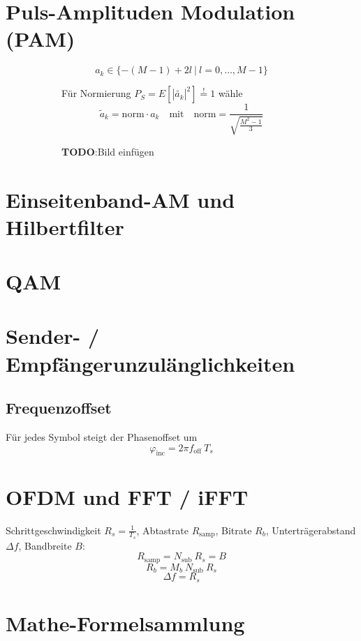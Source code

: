 \documentclass[a4paper, 11pt]{article}
\begin{document}
\section*{Puls-Amplituden Modulation (PAM)}
\begin{figure}[H]
	\begin{subfigure}{0.54\textwidth}
		\[
			a_{k} \in \{-(M - 1) + 2l ~ | ~ l = 0, \ldots, M-1\}
		\]

		Für Normierung $P_S = E \left[|\tilde{a_k}|^2 \right] \overset{!}{=} 1$ wähle
		\[
			\tilde a_k = \mathrm{norm} \cdot a_k \quad \text{mit} \quad \mathrm{norm} = \frac{1}{\sqrt{\frac{M^2 - 1}{3}}}
		\]
	\end{subfigure}
	\begin{subfigure}{0.45\textwidth}
		\textbf{TODO}:Bild einfügen 
	\end{subfigure}
\end{figure}


\section*{Einseitenband-AM und Hilbertfilter}
\section*{QAM}
\section*{Sender- / Empfängerunzulänglichkeiten}
\subsection*{Frequenzoffset}
Für jedes Symbol steigt der Phasenoffset um
\[
	\varphi_{\mathrm{inc}} = 2 \pi f_{\mathrm{off}} ~ T_s
\]

\section*{OFDM und FFT / iFFT}
Schrittgeschwindigkeit $R_s = \frac{1}{T_s}$, Abtastrate $R_{\mathrm{samp}}$, Bitrate $R_b$, Unterträgerabstand $\Delta f$, Bandbreite $B$:
\[
	R_{\mathrm{samp}} = N_{\mathrm{sub}} ~ R_s = B
\]
\[
	R_b = M_b ~ N_{\mathrm{sub}} ~ R_s
\]
\[
	\Delta f = R_s
\]


\section*{Mathe-Formelsammlung}
\end{document}
